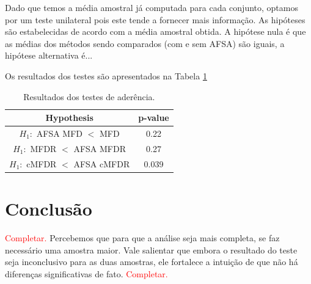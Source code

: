 \documentclass[conference]{IEEEtran}
\begin{document}
Dado que temos a média amostral já computada para cada conjunto, optamos por um teste unilateral pois este tende a fornecer mais informação.
As hipóteses são estabelecidas de acordo com a média amostral obtida.
A hipótese nula é que as médias dos métodos sendo comparados (com e sem AFSA) são iguais, a hipótese alternativa é...

Os resultados dos testes são apresentados na Tabela \ref{tab:rank_sum}
\begin{table}[h]
	\centering
	\caption{Resultados dos testes de aderência.}
	\label{tab:rank_sum}
	\begin{tabular}{c|c}
		\hline
		Hypothesis							& p-value\\
		\hline
		$H_1:$ AFSA MFD $<$ MFD   			& 0.22    \\
		$H_1:$ MFDR  $<$ AFSA MFDR			& 0.27    \\
		$H_1:$ cMFDR $<$ AFSA cMFDR			& 0.039    \\
		\hline
	\end{tabular}
\end{table}

\section{Conclusão}
\label{sec:conclusao}
\textcolor{red}{Completar.}
Percebemos que para que a análise seja mais completa, se faz necessário uma amostra maior.
Vale salientar que embora o resultado do teste seja inconclusivo para as duas amostras, ele fortalece a intuição de que não há diferenças significativas de fato.
\textcolor{red}{Completar.}



% 

\end{document}
